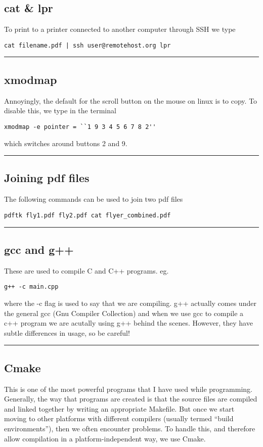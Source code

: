 \documentclass[a4paper, 10pt]{article}
\newcommand{\mybotrule}{\vspace{4mm}\hrule}
\begin{document}
\subsection*{cat \& lpr}
To print to a printer connected to another computer through SSH we type 
\begin{verbatim}
cat filename.pdf | ssh user@remotehost.org lpr
\end{verbatim}
\mybotrule

\subsection*{xmodmap}
Annoyingly, the default for the scroll button on the mouse on linux is to copy. To disable this, we type in the terminal
\begin{verbatim}
xmodmap -e pointer = ``1 9 3 4 5 6 7 8 2''
\end{verbatim}
which switches around buttons 2 and 9.
\mybotrule





\subsection*{Joining pdf files}
The following commands can be used to join two pdf files
\begin{verbatim}
pdftk fly1.pdf fly2.pdf cat flyer_combined.pdf
\end{verbatim}
\mybotrule

\subsection*{gcc and g++}
These are used to compile C and C++ programs. eg.
\begin{verbatim}
g++ -c main.cpp
\end{verbatim}
where the -c flag is used to say that we are compiling. g++ actually comes under the general gcc (Gnu Compiler Collection) and when we use gcc to compile a c++ program we are acutally using g++ behind the scenes. However, they have subtle differences in usage, so be careful!
\mybotrule

\subsection*{Cmake}
This is one of the most powerful programs that I have used while
programming. Generally, the way that programs are created is that the
source files are compiled and linked together by writing an
appropriate Makefile. But once we start moving to other platforms with
different compilers (usually termed ``build environments''), then we
often encounter problems. To handle this, and therefore allow
compilation in a platform-independent way, we use Cmake. 
\end{document}
